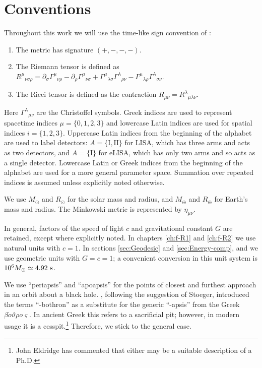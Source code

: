 \chapter{Conventions}
\label{conventions}

Throughout this work we will use the time-like sign convention of \citet{Landau1975}:
\begin{enumerate}
\item The metric has signature $(+,-,-,-)$.
\item The Riemann tensor is defined as ${R^\mu}_{\nu\sigma\rho} = \partial_\sigma {\Gamma^\mu}_{\nu\rho} - \partial_\rho {\Gamma^\mu}_{\nu\sigma} + {\Gamma^\mu}_{\lambda\sigma}{\Gamma^\lambda}_{\rho\nu} - {\Gamma^\mu}_{\lambda\rho}{\Gamma^\lambda}_{\sigma\nu}$.
\item The Ricci tensor is defined as the contraction $R_{\mu\nu} = {R^\lambda}_{\mu\lambda\nu}$.
\end{enumerate}
Here ${\Gamma^\lambda}_{\mu\nu}$ are the Christoffel symbols. Greek indices are used to represent spacetime indices $\mu = \{0,1,2,3\}$ %
and lowercase Latin indices are used for spatial indices $i = \{1,2,3\}$. Uppercase Latin indices from the beginning of the alphabet are used to label detectors: $A = \{\mathrm{I}, \mathrm{II}\}$ for LISA, which has three arms and acts as two detectors, and $A = \{\mathrm{I}\}$ for eLISA, which has only two arms and so acts as a single detector. Lowercase Latin or Greek indices from the beginning of the alphabet are used for a more general parameter space. Summation over repeated indices is assumed unless explicitly noted otherwise.

We use $M_\odot$ and $R_\odot$ for the solar mass and radius, and $M_\oplus$ and $R_\oplus$ for Earth's mass and radius. The Minkowski metric is represented by $\eta_{\mu\nu}$.

In general, factors of the speed of light $c$ and gravitational constant $G$ are retained, except where explicitly noted. In chapters \ref{ch:f-R1} and \ref{ch:f-R2} we use natural units with $c = 1$. In sections \ref{sec:Geodesic} and \ref{sec:Energy-comp},  and  we use geometric units with $G = c = 1$; a convenient conversion in this unit system is $10^6 M_\odot \simeq 4.92~\mathrm{s}$.

We use ``periapsis'' and ``apoapsis'' for the points of closest and furthest approach in an orbit about a black hole. \citet{Frank1976}, following the suggestion of Stoeger, introduced the terms ``-bothron'' as a substitute for the generic ``-apsis'' from the Greek {$\mathit{\beta\acute{o}\vartheta\rho o \varsigma}$}. In ancient Greek this refers to a sacrificial pit; however, in modern usage it is a cesspit.\footnote{John Eldridge has commented that either may be a suitable description of a Ph.D.} Therefore, we stick to the general case.